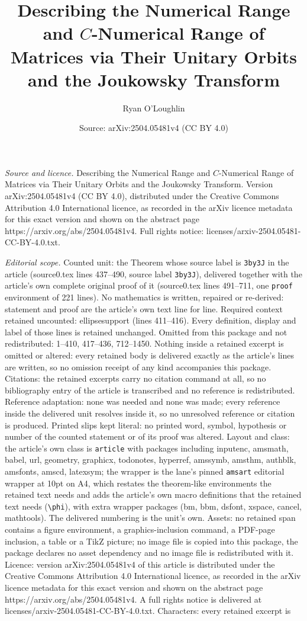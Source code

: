 \documentclass[10pt,a4paper]{amsart}
\title[Describing the Numerical Range and $C$-Numerical Range of Ma]{Describing the Numerical Range and $C$-Numerical Range of Matrices via Their Unitary Orbits and the Joukowsky Transform}
\author{Ryan O'Loughlin}
\date{Source: arXiv:2504.05481v4 (CC BY 4.0)}
\begin{document}
\maketitle

\noindent\emph{Source and licence.} Describing the Numerical Range and $C$-Numerical Range of Matrices via Their Unitary Orbits and the Joukowsky Transform. Version arXiv:2504.05481v4 (CC BY 4.0), distributed under the Creative Commons Attribution 4.0 International licence, as recorded in the arXiv licence metadata for this exact version and shown on the abstract page https://arxiv.org/abs/2504.05481v4. Full rights notice: licenses/arxiv-2504.05481-CC-BY-4.0.txt.\par\smallskip

\noindent\textit{Editorial scope.} Counted unit: the Theorem whose source label is \texttt{3by3J} in the article (source0.tex lines 437--490, source label \texttt{3by3J}), delivered together with the article's own complete original proof of it (source0.tex lines 491--711, one \texttt{proof} environment of 221 lines). No mathematics is written, repaired or re-derived: statement and proof are the article's own text line for line. Required context retained uncounted: ellipsesupport (lines 411--416). Every definition, display and label of those lines is retained unchanged. Omitted from this package and not redistributed: 1--410, 417--436, 712--1450. Nothing inside a retained excerpt is omitted or altered: every retained body is delivered exactly as the article's lines are written, so no omission receipt of any kind accompanies this package. Citations: the retained excerpts carry no citation command at all, so no bibliography entry of the article is transcribed and no reference is redistributed. Reference adaptation: none was needed and none was made; every reference inside the delivered unit resolves inside it, so no unresolved reference or citation is produced. Printed slips kept literal: no printed word, symbol, hypothesis or number of the counted statement or of its proof was altered. Layout and class: the article's own class is \texttt{article} with packages including inputenc, amsmath, babel, url, geometry, graphicx, todonotes, hyperref, amssymb, amsthm, authblk, amsfonts, amscd, latexsym; the wrapper is the lane's pinned \texttt{amsart} editorial wrapper at 10pt on A4, which restates the theorem-like environments the retained text needs and adds the article's own macro definitions that the retained text needs (\texttt{\textbackslash phi}), with extra wrapper packages (bm, bbm, dsfont, xspace, cancel, mathtools). The delivered numbering is the unit's own. Assets: no retained span contains a figure environment, a graphics-inclusion command, a PDF-page inclusion, a table or a TikZ picture; no image file is copied into this package, the package declares no asset dependency and no image file is redistributed with it. Licence: version arXiv:2504.05481v4 of this article is distributed under the Creative Commons Attribution 4.0 International licence, as recorded in the arXiv licence metadata for this exact version and shown on the abstract page https://arxiv.org/abs/2504.05481v4. A full rights notice is delivered at licenses/arxiv-2504.05481-CC-BY-4.0.txt. Characters: every retained excerpt is 
\end{document}
